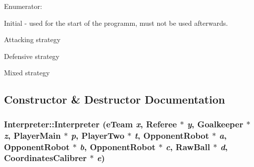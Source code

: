 \begin{Desc}
\item[Enumerator: ]\par
\begin{description}
\item[{\em 
\hypertarget{classInterpreter_a0fb49436c8c14ca79e13f1cd78119088af1c3928f408be0d85ce73e1686e519d9}{
INIT}
\label{classInterpreter_a0fb49436c8c14ca79e13f1cd78119088af1c3928f408be0d85ce73e1686e519d9}
}]Initial -\/ used for the start of the programm, must not be used afterwards. \item[{\em 
\hypertarget{classInterpreter_a0fb49436c8c14ca79e13f1cd78119088a8bf993c8b673e31f609171552d65c4c4}{
ATK}
\label{classInterpreter_a0fb49436c8c14ca79e13f1cd78119088a8bf993c8b673e31f609171552d65c4c4}
}]Attacking strategy \item[{\em 
\hypertarget{classInterpreter_a0fb49436c8c14ca79e13f1cd78119088ae58df17fd988314c295b980f6a5a6a75}{
DEF}
\label{classInterpreter_a0fb49436c8c14ca79e13f1cd78119088ae58df17fd988314c295b980f6a5a6a75}
}]Defensive strategy \item[{\em 
\hypertarget{classInterpreter_a0fb49436c8c14ca79e13f1cd78119088a5509091a7f3746995da83c92dd449187}{
MIX}
\label{classInterpreter_a0fb49436c8c14ca79e13f1cd78119088a5509091a7f3746995da83c92dd449187}
}]Mixed strategy \end{description}
\end{Desc}



\subsection{Constructor \& Destructor Documentation}
\hypertarget{classInterpreter_aa43e2d0df9f986ef4bde498aa8eadc04}{
\subsubsection[{Interpreter}]{\setlength{\rightskip}{0pt plus 5cm}Interpreter::Interpreter (eTeam {\em x}, \/  Referee $\ast$ {\em y}, \/  {\bf Goalkeeper} $\ast$ {\em z}, \/  {\bf PlayerMain} $\ast$ {\em p}, \/  {\bf PlayerTwo} $\ast$ {\em t}, \/  {\bf OpponentRobot} $\ast$ {\em a}, \/  {\bf OpponentRobot} $\ast$ {\em b}, \/  {\bf OpponentRobot} $\ast$ {\em c}, \/  RawBall $\ast$ {\em d}, \/  {\bf CoordinatesCalibrer} $\ast$ {\em e})}}
\label{classInterpreter_aa43e2d0df9f986ef4bde498aa8eadc04}

